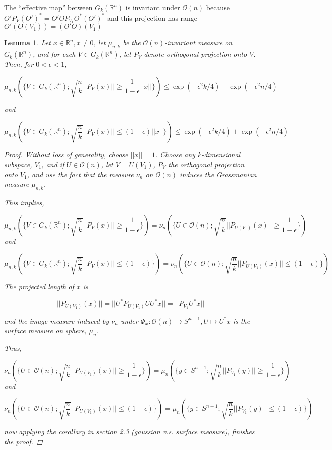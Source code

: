 \documentclass[12pt]{article}
\newtheorem{lemma}[thm]{Lemma}
\theoremstyle{remark}
\def\eps{\epsilon}
\newcommand{\reals}[0] { \mathbb{R}}
\newcommand{\cO}[0] { \mathcal{O} } %
\newcommand{\rarw}[0] { \rightarrow }
\begin{document}
The ``effective map'' between $G_k( \reals^n)$ is invariant under $\cO(n)$ because $O' P_V (O')^* = O'O P_{V_1} O^*(O')^*$ and this projection has range $ O'(O(V_1)) = (O'O)(V_1)$



\begin{lemma}

Let $x \in \reals^n, x \not = 0$, let $\mu_{n,k}$ be the $\cO(n)$-invariant measure on $G_k(\reals^n)$, and for each $V\in G_k(\reals^n)$, let $P_V$ denote orthogonal projection onto $V$. Then, for $0 < \eps < 1$,

$$
	\mu_{n,k} ( \{ V \in G_k( \reals^n) ; \sqrt{\frac{n}{k}}  || P_V(x)|| \ge \frac{1}{1- \eps} ||x||  \} )   \le  \exp{( - \eps^2 k /4 )} + \exp{( - \eps^2 n /4 )}
$$

and 

$$
	\mu_{n,k} ( \{ V \in G_k( \reals^n) ; \sqrt{\frac{n}{k}}  || P_V(x)|| \le (1- \eps) ||x||  \} )   \le  \exp{( - \eps^2 k /4 )} + \exp{( - \eps^2 n /4 )}
$$

\begin{proof} 

	Without loss of generality, choose $||x||=1$. Choose any $k$-dimensional subspace, $V_1$, and if $U \in \cO(n)$, let $V=U(V_1)$, $P_V$ the orthogonal projection onto $V_1$, and use the fact that the measure $\nu_n$ on $\cO(n)$ induces the Grassmanian measure $\mu_{n,k}$.
	
	This implies, 
	
$$
	\mu_{n,k} ( \{ V \in G_k( \reals^n) ; \sqrt{\frac{n}{k}}  || P_V(x)|| \ge \frac{1}{1- \eps}   \} )   = \nu_n( \{  U \in \cO(n) ; \sqrt{\frac{n}{k}} || P_{U(V_1)} (x) || \ge \frac{1}{1-\eps} \} )
$$
	and
	
$$
	\mu_{n,k} ( \{ V \in G_k( \reals^n) ; \sqrt{\frac{n}{k}}  || P_V(x)|| \le (1- \eps)  \} )   = \nu_n( \{  U \in \cO(n) ; \sqrt{\frac{n}{k}} || P_{U(V_1)} (x) || \le (1-\eps) \} )
$$

The projected length of $x$ is

$$
	||P_{U(V_1)}(x)|| = || U^* P_{U(V_1)} U U^* x || = || P_{V_1} U^* x ||
$$

and the image measure induced by $\nu_n$ under $\Phi_x: \cO(n) \rarw S^{n-1},  U \mapsto U^*x$ is the surface measure on sphere, $\mu_n$.

Thus,

$$
	\nu_n( \{  U \in \cO(n) ; \sqrt{\frac{n}{k}} || P_{U(V_1)} (x) || \ge \frac{1}{1-\eps} \} ) = \mu_{n} ( \{ y \in S^{n-1} ; \sqrt{\frac{n}{k}}  || P_{V_1}(y)|| \ge \frac{1}{1- \eps}   \} ) 
$$
	and
	
$$
	\nu_n( \{  U \in \cO(n) ; \sqrt{\frac{n}{k}} || P_{U(V_1)} (x) || \le (1-\eps) \} ) = \mu_{n} ( \{ y \in S^{n-1} ; \sqrt{\frac{n}{k}}  || P_{V_1}(y)|| \le (1- \eps)  \} ) 
$$

now applying the corollary in section 2.3 (gaussian v.s. surface measure), finishes the proof.

\end{proof}

\end{lemma}
\end{document}
